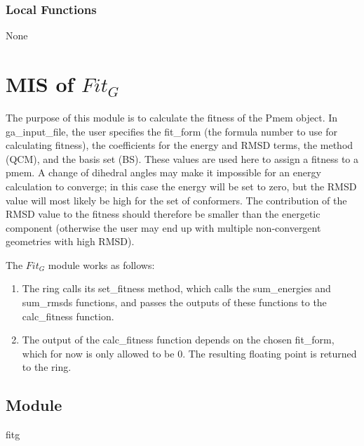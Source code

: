 \documentclass[12pt, titlepage]{article}
\begin{document}

\subsubsection{Local Functions}

None

\section{MIS of $Fit_G$} \label{section-fitg}

The purpose of this module is to calculate the fitness of the Pmem object. In 
ga\_input\_file, the user specifies the fit\_form (the formula number to use 
for calculating fitness), the coefficients for the energy and RMSD terms, the 
method (QCM), and the basis set (BS). These values are used here to assign a 
fitness to a pmem. A change of dihedral angles may make it impossible for an 
energy calculation to converge; in this case the energy will be set to zero, 
but the RMSD value will most likely be high for the set of conformers. The 
contribution of the RMSD value to the fitness should therefore be smaller than 
the energetic component (otherwise the user may end up with multiple 
non-convergent geometries with high RMSD).

The $Fit_G$ module works as follows:
\begin{enumerate}
	\item The ring calls its set\_fitness method, which calls the sum\_energies 
	and sum\_rmsds functions, and passes the outputs of these functions to the 
	calc\_fitness function.
	\item The output of the calc\_fitness function depends on the chosen 
	fit\_form, which for now is only allowed to be 0. The resulting floating 
	point is returned to the ring.
\end{enumerate}

\subsection{Module}

fitg
\end{document}

